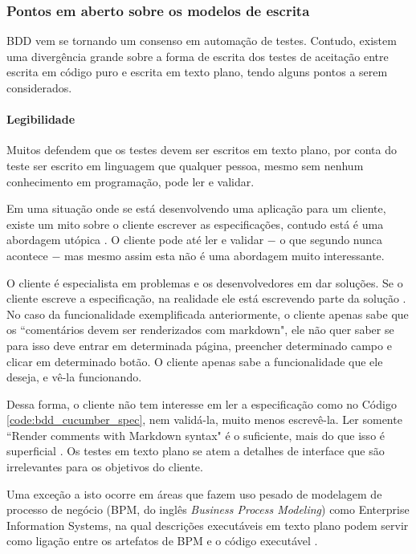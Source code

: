 \subsubsection{Pontos em aberto sobre os modelos de escrita}
\label{ssub:pontos em aberto}

BDD vem se tornando um consenso em automação de testes. Contudo, existem uma divergência grande sobre a forma de escrita dos testes de aceitação entre escrita em código puro e escrita em texto plano, tendo alguns pontos a serem considerados.


\paragraph{Legibilidade}
\label{sssub:legibilidade}

Muitos defendem que os testes devem ser escritos em texto plano, por conta do teste ser escrito em linguagem que qualquer pessoa, mesmo sem nenhum conhecimento em programação, pode ler e validar.

Em uma situação onde se está desenvolvendo uma aplicação para um cliente, existe um mito sobre o cliente escrever as especificações, contudo está é uma abordagem utópica \cite{SteakOverCucumber, CucumberForVegetarians, ClientsWritingCucumber}. O cliente pode até ler e validar $-$ o que segundo  nunca acontece $-$ mas mesmo assim esta não é uma abordagem muito interessante.

O cliente é especialista em problemas e os desenvolvedores em dar soluções. Se o cliente escreve a especificação, na realidade ele está escrevendo parte da solução \cite{SteakOverCucumber}. No caso da funcionalidade exemplificada anteriormente, o cliente apenas sabe que os ``comentários devem ser renderizados com markdown", ele não quer saber se para isso deve entrar em determinada página, preencher determinado campo e clicar em determinado botão. O cliente apenas sabe a funcionalidade que ele deseja, e vê-la funcionando.

Dessa forma, o cliente não tem interesse em ler a especificação como no Código \ref{code:bdd_cucumber_spec}, nem validá-la, muito menos escrevê-la. Ler somente ``Render comments with Markdown syntax" é o suficiente, mais do que isso é superficial \cite{WhyBotherWithCucumberTesting}. Os testes em texto plano se atem a detalhes de interface que são irrelevantes para os objetivos do cliente.

Uma exceção a isto ocorre em áreas que fazem uso pesado de modelagem de processo de negócio (BPM, do inglês \textit{Business Process Modeling})  como Enterprise Information Systems, na qual descrições executáveis em texto plano podem servir como ligação entre os artefatos de BPM e o código executável \cite{IntroducingBLDD}.

